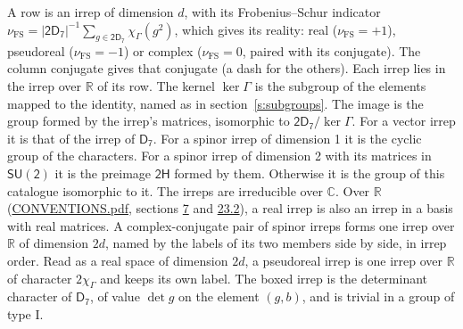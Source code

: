 \documentclass[10pt,a4paper]{article}
\numberwithin{equation}{section}
\newcommand{\grp}[1]{\mathsf{#1}}
\newcommand{\irchar}[1]{\chi_{#1}}
\newcommand{\fsind}{\nu_{\mathrm{FS}}}
\begin{document}
\leavevmode\label{n:index.frobenius}\label{n:head.irrep}\label{n:head.reality}A row is an irrep of dimension $d$, with its Frobenius--Schur indicator $\fsind = |\grp{2D_{7}}|^{-1}\allowbreak\sum_{g\in\grp{2D_{7}}}\irchar{\Gamma}(g^2)$, which gives its reality: real ($\fsind = +1$), pseudoreal ($\fsind = -1$) or complex ($\fsind = 0$, paired with its conjugate). \label{n:head.conjugate}The column conjugate gives that conjugate (a dash for the others). \label{n:head.over.real}Each irrep lies in the irrep over $\mathbb{R}$ of its row. \label{n:head.kernel}The kernel $\ker\Gamma$ is the subgroup of the elements mapped to the identity, named as in section~\ref{s:subgroups}. \label{n:head.image}The image is the group formed by the irrep's matrices, isomorphic to $\grp{2D_{7}}/\ker\Gamma$. For a vector irrep it is that of the irrep of \href{../../../rotation/data/pdf/D7.pdf}{$\grp{D_{7}}$}. For a spinor irrep of dimension 1 it is the cyclic group of the characters. For a spinor irrep of dimension 2 with its matrices in $\grp{SU(2)}$ it is the preimage $\grp{2H}$ formed by them. Otherwise it is the group of this catalogue isomorphic to it. The irreps are irreducible over $\mathbb{C}$. Over $\mathbb{R}$ (\href{../../CONVENTIONS.pdf}{CONVENTIONS.pdf}, sections \href{../../../rotation/CONVENTIONS.pdf\#conv.7}{7} and \href{../../CONVENTIONS.pdf\#conv.23.2}{23.2}), a real irrep is also an irrep in a basis with real matrices. A complex-conjugate pair of spinor irreps forms one irrep over $\mathbb{R}$ of dimension $2d$, named by the labels of its two members side by side, in irrep order. Read as a real space of dimension $2d$, a pseudoreal irrep is one irrep over $\mathbb{R}$ of character $2\irchar{\Gamma}$ and keeps its own label. \label{n:mark.determinant}The boxed irrep is the determinant character of \href{../../../rotation/data/pdf/D7.pdf}{$\grp{D_{7}}$}, of value $\det g$ on the element $(g, b)$, and is trivial in a group of type I.
\setlength{\emergencystretch}{2em}\par\setlength{\emergencystretch}{0pt}
\end{document}
